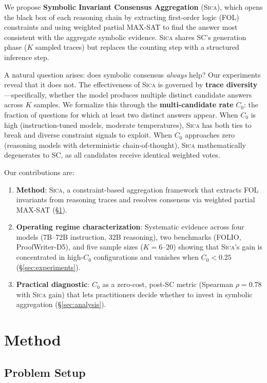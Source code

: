 \documentclass[11pt,a4paper]{article}
\newcommand{\sica}{\textsc{Sica}}
\begin{document}
We propose \textbf{Symbolic Invariant Consensus Aggregation} (\sica{}), which opens the black box of each reasoning chain by extracting first-order logic (FOL) constraints and using weighted partial MAX-SAT to find the answer most consistent with the aggregate symbolic evidence.
\sica{} shares SC's generation phase ($K$ sampled traces) but replaces the counting step with a structured inference step.

A natural question arises: does symbolic consensus \emph{always} help?
Our experiments reveal that it does not.
The effectiveness of \sica{} is governed by \textbf{trace diversity}---specifically, whether the model produces multiple distinct candidate answers across $K$ samples.
We formalize this through the \textbf{multi-candidate rate} $C_0$: the fraction of questions for which at least two distinct answers appear.
When $C_0$ is high (instruction-tuned models, moderate temperatures), \sica{} has both ties to break and diverse constraint signals to exploit.
When $C_0$ approaches zero (reasoning models with deterministic chain-of-thought), \sica{} mathematically degenerates to SC, as all candidates receive identical weighted votes.

Our contributions are:
\begin{enumerate}
\item \textbf{Method}: \sica{}, a constraint-based aggregation framework that extracts FOL invariants from reasoning traces and resolves consensus via weighted partial MAX-SAT (\S\ref{sec:method}).
\item \textbf{Operating regime characterization}: Systematic evidence across four models (7B--72B instruction, 32B reasoning), two benchmarks (FOLIO, ProofWriter-D5), and five sample sizes ($K{=}6$--$20$) showing that \sica{}'s gain is concentrated in high-$C_0$ configurations and vanishes when $C_0 < 0.25$ (\S\ref{sec:experiments}).
\item \textbf{Practical diagnostic}: $C_0$ as a zero-cost, post-SC metric (Spearman $\rho{=}0.78$ with \sica{} gain) that lets practitioners decide whether to invest in symbolic aggregation (\S\ref{sec:analysis}).
\end{enumerate}

\section{Method}
\label{sec:method}

\subsection{Problem Setup}
\end{document}
